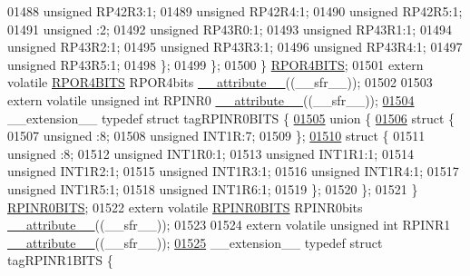 \begin{DoxyCode}
01488       \textcolor{keywordtype}{unsigned} RP42R3:1;
01489       \textcolor{keywordtype}{unsigned} RP42R4:1;
01490       \textcolor{keywordtype}{unsigned} RP42R5:1;
01491       \textcolor{keywordtype}{unsigned} :2;
01492       \textcolor{keywordtype}{unsigned} RP43R0:1;
01493       \textcolor{keywordtype}{unsigned} RP43R1:1;
01494       \textcolor{keywordtype}{unsigned} RP43R2:1;
01495       \textcolor{keywordtype}{unsigned} RP43R3:1;
01496       \textcolor{keywordtype}{unsigned} RP43R4:1;
01497       \textcolor{keywordtype}{unsigned} RP43R5:1;
01498     \};
01499   \};
01500 \} \hyperlink{a00014_d3/d95/a00757}{RPOR4BITS};
01501 \textcolor{keyword}{extern} \textcolor{keyword}{volatile} \hyperlink{a00014_d3/d95/a00757}{RPOR4BITS} RPOR4bits \hyperlink{a00015_a493c46f03454991ccc5aa7a6e1dfb2a7}{\_\_attribute\_\_}((\_\_sfr\_\_));
01502 
01503 \textcolor{keyword}{extern} \textcolor{keyword}{volatile} \textcolor{keywordtype}{unsigned} \textcolor{keywordtype}{int}  RPINR0 \hyperlink{a00015_a493c46f03454991ccc5aa7a6e1dfb2a7}{\_\_attribute\_\_}((\_\_sfr\_\_));
\hypertarget{a00015_source_l01504}{}\hyperlink{a00014}{01504} \_\_extension\_\_ \textcolor{keyword}{typedef} \textcolor{keyword}{struct }tagRPINR0BITS \{
\hypertarget{a00015_source_l01505}{}\hyperlink{a00015}{01505}   \textcolor{keyword}{union }\{
\hypertarget{a00015_source_l01506}{}\hyperlink{a00015}{01506}     \textcolor{keyword}{struct }\{
01507       \textcolor{keywordtype}{unsigned} :8;
01508       \textcolor{keywordtype}{unsigned} INT1R:7;
01509     \};
\hypertarget{a00015_source_l01510}{}\hyperlink{a00015}{01510}     \textcolor{keyword}{struct }\{
01511       \textcolor{keywordtype}{unsigned} :8;
01512       \textcolor{keywordtype}{unsigned} INT1R0:1;
01513       \textcolor{keywordtype}{unsigned} INT1R1:1;
01514       \textcolor{keywordtype}{unsigned} INT1R2:1;
01515       \textcolor{keywordtype}{unsigned} INT1R3:1;
01516       \textcolor{keywordtype}{unsigned} INT1R4:1;
01517       \textcolor{keywordtype}{unsigned} INT1R5:1;
01518       \textcolor{keywordtype}{unsigned} INT1R6:1;
01519     \};
01520   \};
01521 \} \hyperlink{a00014_da/d3a/a00694}{RPINR0BITS};
01522 \textcolor{keyword}{extern} \textcolor{keyword}{volatile} \hyperlink{a00014_da/d3a/a00694}{RPINR0BITS} RPINR0bits \hyperlink{a00015_a493c46f03454991ccc5aa7a6e1dfb2a7}{\_\_attribute\_\_}((\_\_sfr\_\_));
01523 
01524 \textcolor{keyword}{extern} \textcolor{keyword}{volatile} \textcolor{keywordtype}{unsigned} \textcolor{keywordtype}{int}  RPINR1 \hyperlink{a00015_a493c46f03454991ccc5aa7a6e1dfb2a7}{\_\_attribute\_\_}((\_\_sfr\_\_));
\hypertarget{a00015_source_l01525}{}\hyperlink{a00014}{01525} \_\_extension\_\_ \textcolor{keyword}{typedef} \textcolor{keyword}{struct }tagRPINR1BITS \{

\end{DoxyCode}

